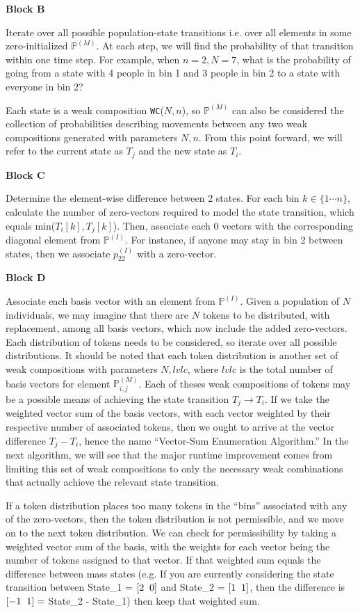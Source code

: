 \documentclass{article}
\begin{document}
\textbf{Block B}

Iterate over all possible population-state transitions i.e. over all elements in some zero-initialized $\mathbb{P}^{(M)}$. At each step, we will find the probability of that transition within one time step. For example, when $n=2, N=7$, what is the probability of going from a state with 4 people in bin 1 and 3 people in bin 2 to a state with everyone in bin 2?

Each state is a weak composition \texttt{WC}($N,n$), so $\mathbb{P}^{(M)}$ can also be considered the collection of probabilities describing movements between any two weak compositions generated with parameters $N, n$. From this point forward, we will refer to the current state as $T_j$ and the new state as $T_i$.

\textbf{Block C}

Determine the element-wise difference between 2 states. For each bin $k\in\{1 \cdots n\}$, calculate the number of zero-vectors required to model the state transition, which equals min($T_i[k],T_j[k]$). Then, associate each 0 vectors with the corresponding diagonal element from $\mathbb{P}^{(I)}$. For instance, if anyone may stay in bin 2 between states, then we associate $p_{22}^{(I)}$ with a zero-vector.

\textbf{Block D}

Associate each basis vector with an element from $\mathbb{P}^{(I)}$. Given a population of $N$ individuals,  we may imagine that there are $N$ tokens to be distributed, with replacement, among all basis vectors, which now include the added zero-vectors. Each distribution of tokens needs to be considered, so iterate over all possible distributions. It should be noted that each token distribution is another set of weak compositions with parameters $N, lvlc$, where $lvlc$ is the total number of basis vectors for element $\mathbb{P}^{(M)}_{i,j}$. Each of theses weak compositions of tokens may be a possible means of achieving the state transition $T_j \rightarrow T_i$. If we take the weighted vector sum of the basis vectors, with each vector weighted by their respective number of associated tokens, then we ought to arrive at the vector difference $T_j - T_i$, hence the name ``Vector-Sum Enumeration Algorithm.'' In the next algorithm, we will see that the major runtime improvement comes from limiting this set of weak compositions to only the necessary weak combinations that actually achieve the relevant state transition.

If a token distribution places too many tokens in the ``bins'' associated with any of the zero-vectors, then the token distribution is not permissible, and we move on to the next token distribution. We can check for permissibility by taking a weighted vector sum of the basis, with the weights for each vector being the number of tokens assigned to that vector. If that weighted sum equals the difference between mass states (e.g. If you are currently considering the state transition between State\_1 = $[2 \hspace{2mm} 0]$ and State\_2 = $[1 \hspace{2mm} 1]$, then the difference is $[-1 \hspace{2mm} 1]=$ State\_2 - State\_1) then keep that weighted sum.
\end{document}
